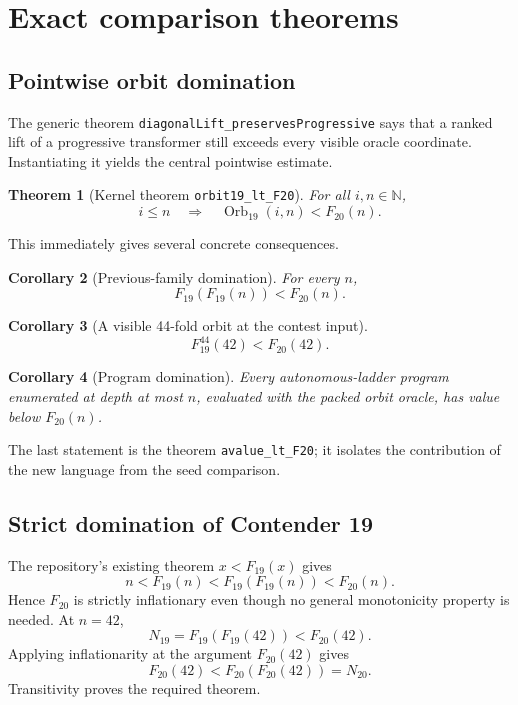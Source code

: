 \documentclass[11pt]{article}
\newtheorem{theorem}{Theorem}[section]
\newtheorem{corollary}[theorem]{Corollary}
\theoremstyle{definition}
\theoremstyle{remark}
\newcommand{\Orb}{\operatorname{Orb}_{19}}
\begin{document}
\section{Exact comparison theorems}
\label{sec:comparison}

\subsection{Pointwise orbit domination}

The generic theorem \texttt{diagonalLift\_preservesProgressive} says that a
ranked lift of a progressive transformer still exceeds every visible oracle
coordinate.  Instantiating it yields the central pointwise estimate.

\begin{theorem}[Kernel theorem \texttt{orbit19\_lt\_F20}]
For all $i,n\in\mathbb N$,
\[
  i\leq n \quad\Longrightarrow\quad \Orb(i,n)<F_{20}(n).
\]
\end{theorem}

This immediately gives several concrete consequences.

\begin{corollary}[Previous-family domination]
For every $n$,
\[
  F_{19}(F_{19}(n))<F_{20}(n).
\]
\end{corollary}

\begin{corollary}[A visible 44-fold orbit at the contest input]
\[
  F_{19}^{44}(42)<F_{20}(42).
\]
\end{corollary}

\begin{corollary}[Program domination]
Every autonomous-ladder program enumerated at depth at most $n$, evaluated
with the packed orbit oracle, has value below $F_{20}(n)$.
\end{corollary}

The last statement is the theorem \texttt{avalue\_lt\_F20}; it isolates the
contribution of the new language from the seed comparison.

\subsection{Strict domination of Contender 19}

The repository's existing theorem $x<F_{19}(x)$ gives
\[
  n<F_{19}(n)<F_{19}(F_{19}(n))<F_{20}(n).
\]
Hence $F_{20}$ is strictly inflationary even though no general monotonicity
property is needed.  At $n=42$,
\[
  N_{19}=F_{19}(F_{19}(42))<F_{20}(42).
\]
Applying inflationarity at the argument $F_{20}(42)$ gives
\[
  F_{20}(42)<F_{20}(F_{20}(42))=N_{20}.
\]
Transitivity proves the required theorem.
\end{document}
